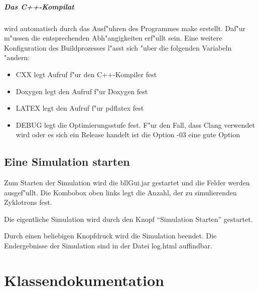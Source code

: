 \documentclass[14pt, a4paper]{report}
\begin{document}
\paragraph{Das C++-Kompilat} wird automatisch durch das Ausf"uhren des Programmes make
erstellt. Daf"ur m"ussen die entsprechenden Abh"angigkeiten erf"ullt sein. Eine weitere
Konfiguration des Buildprozesses l"asst sich "uber die folgenden Variabeln "andern:
\begin{itemize}
\item CXX legt Aufruf f"ur den C++-Kompiler fest
\item Doxygen legt den Aufruf f"ur Doxygen fest
\item LATEX legt den Aufruf f"ur pdflatex fest 
\item DEBUG legt die Optimierungsstufe fest. F"ur den Fall, dass Clang verwendet wird 
oder es sich ein Release handelt ist die Option -03 eine gute Option
\end{itemize}

\section{Eine Simulation starten}
Zum Starten der Simulation wird die bllGui.jar gestartet und die Felder werden 
ausgef"ullt. Die Kombobox oben links legt die Anzahl, der zu simulierenden Zyklotrons 
fest.

Die eigentliche Simulation wird durch den Knopf "`Simulation Starten"' gestartet.

Durch einen beliebigen Knopfdruck wird die Simulation beendet. Die Endergebnisse der
Simulation sind in der Datei log.html auffindbar.

\chapter{Klassendokumentation}
\newpage
\end{document}
